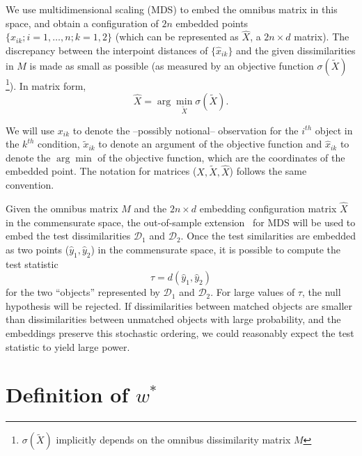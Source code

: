 \documentclass[12pt,oneside,final]{thesis}
\begin{document}
 We use multidimensional scaling (MDS) \cite{borg+groenen:1997} to embed  the omnibus matrix in this  space, and obtain  a configuration of $2n$ embedded points $\{\hat{x}_{ik}; i=1,\ldots,n;k=1,2\}$ (which can be represented as $\hat{X}$, a $2n \times d$ matrix). The discrepancy between the interpoint distances of $\{\hat{x}_{ik}\}$ and the given dissimilarities in  $M$ is made as small  as possible (as measured by an objective function $\sigma(\widetilde{X})$ \footnote{$\sigma(\widetilde{X})$ implicitly depends on the omnibus dissimilarity matrix $M$}). In matrix form, $$ \hat{X}=\arg \min_{\tilde{X}} \sigma(\tilde{X}).$$ 

\begin{remark} 
We will use $x_{ik}$ to denote the --possibly notional--  observation  for the $i^{th}$ object in the $k^{th}$ condition, $\tilde{x}_{ik}$ to denote an argument of the objective function  and  $\hat{x}_{ik}$  to denote the $\arg\min$  of the objective function, which are the coordinates of the embedded point. The notation for matrices ($X,\tilde{X},\hat{X}$) follows the  same convention.
\end{remark}

  Given the omnibus matrix $M$ and the $2n \times d$ embedding configuration matrix $\hat{X}$ in the commensurate space, the out-of-sample extension~\cite{TrossetOOS} for MDS will be used to embed the test dissimilarities $\mathcal{D}_1$ and $\mathcal{D}_2$.  Once the test similarities are embedded as two points ($\hat{y}_{1},\hat{y}_{2}$) in  the commensurate space, it is possible to  compute the test statistic \[
\tau=d\left(\hat{y}_{1},\hat{y}_{2}\right)\label{teststat}
\] for the two ``objects'' represented by  $\mathcal{D}_1$ and $\mathcal{D}_2$.  For large values of $\tau$, the null hypothesis will be rejected. 
   If  dissimilarities between matched objects are smaller than dissimilarities between unmatched objects with large probability, and the embeddings preserve this stochastic ordering,  we could reasonably expect the test statistic to yield large  power. 
   
   

\section{Definition of  $w^{*}$}
\end{document}
